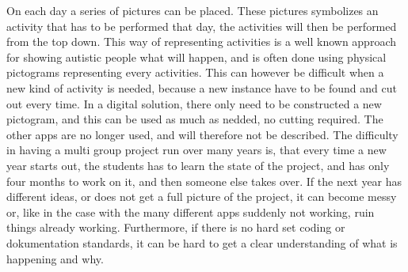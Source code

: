 On each day a series of pictures can be placed. These pictures symbolizes an activity that has to be performed that day, the activities will then be performed from the top down. 
This way of representing activities is a well known approach for showing autistic people what will happen, and is often done using physical pictograms representing every activities. This can however be difficult when a new kind of activity is needed, because a new instance have to be found and cut out every time\cite{AutistTeacher}. In a digital solution, there only need to be constructed a new pictogram, and this can be used as much as nedded, no cutting required. 
The other apps are no longer used, and will therefore not be described. 
The difficulty in having a multi group project run over many years is, that every time a new year starts out, the students has to learn the state of the project, and has only four months to work on it, and then someone else takes over. If the next year has different ideas, or does not get a full picture of the project, it can become messy or, like in the case with the many different apps suddenly not working, ruin things already working. Furthermore, if there is no hard set coding or dokumentation standards, it can be hard to get a clear understanding of what is happening and why.
